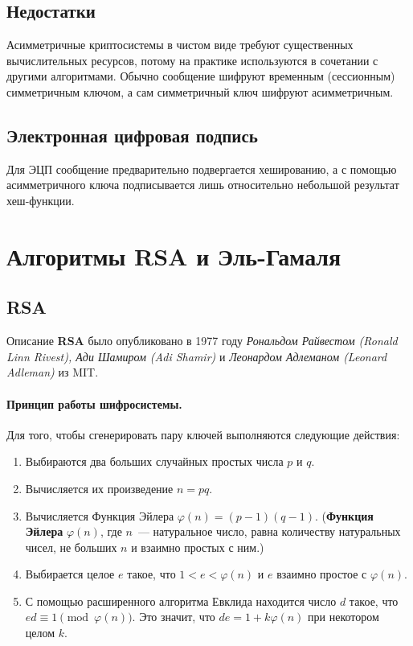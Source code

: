\documentclass[a4paper,10pt]{article}
\begin{document}
\subsection{Недостатки} 
Асимметричные криптосистемы в чистом виде требуют существенных вычислительных ресурсов, потому на практике используются в сочетании с
другими алгоритмами. Обычно сообщение шифруют временным (сессионным) симметричным ключом, а сам симметричный ключ шифруют асимметричным.

\subsection{Электронная цифровая подпись}
Для ЭЦП сообщение предварительно подвергается хешированию, а с помощью асимметричного ключа подписывается лишь относительно небольшой
результат хеш-функции.

\section{Алгоритмы RSA и Эль-Гамаля}
\subsection{RSA}
Описание {\bf RSA} было опубликовано в 1977 году {\it Рональдом Райвестом (Ronald Linn Rivest), Ади Шамиром
(Adi Shamir)} и {\it Леонардом Адлеманом (Leonard Adleman)} из MIT.

\paragraph{Принцип работы шифросистемы.} 
Для того, чтобы сгенерировать пару ключей выполняются следующие действия:
\begin{enumerate}
    \item Выбираются два больших случайных простых числа $p$ и $q$.
    \item Вычисляется их произведение $n=pq$.
    \item Вычисляется Функция Эйлера $\varphi(n)=(p-1)(q-1).$ 
        ({\bf Функция Эйлера} $\varphi(n)$, где $n$~--- натуральное число, равна количеству натуральных чисел, не больших
        $n$ и взаимно простых с ним.)
    \item Выбирается целое $e$ такое, что $1<e<\varphi(n)$ и $e$ взаимно простое с $\varphi(n)$.
    \item С помощью расширенного алгоритма Евклида находится число $d$ такое, что 
        $ed\equiv 1\pmod{\varphi(n)}$. Это значит, что $de = 1 + k\varphi(n)$ при некотором целом $k$.
\end{enumerate}
\end{document}
